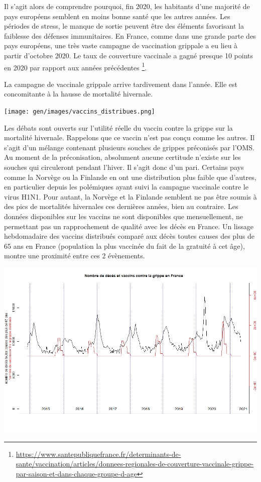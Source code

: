 \documentclass[
]{article}
\begin{document}
Il s'agit alors de comprendre pourquoi, fin 2020, les habitants d'une
majorité de pays européens semblent en moins bonne santé que les autres
années. Les périodes de stress, le manque de sortie peuvent être des
éléments favorisant la faiblesse des défenses immunitaires. En France,
comme dans une grande parte des pays européens, une très vaste campagne
de vaccination grippale a eu lieu à partir d'octobre 2020. Le taux de
couverture vaccinale a gagné presque 10 points en 2020 par rapport aux
années précédentes \footnote{\url{https://www.santepubliquefrance.fr/determinants-de-sante/vaccination/articles/donnees-regionales-de-couverture-vaccinale-grippe-par-saison-et-dans-chaque-groupe-d-age}}.

La campagne de vaccinale grippale arrive tardivement dans l'année. Elle
est concomitante à la hausse de mortalité hivernale.

\texttt{[image: gen/images/vaccins\_distribues.png]}

Les débats sont ouverts sur l'utilité réelle du vaccin contre la grippe
sur la mortalité hivernale. Rappelons que ce vaccin n'est pas conçu
comme les autres. Il s'agit d'un mélange contenant plusieurs souches de
grippes préconisés par l'OMS. Au moment de la préconisation, absolument
aucune certitude n'existe sur les souches qui circuleront pendant
l'hiver. Il s'agit donc d'un pari. Certains pays comme la Norvège ou la
Finlande en ont une distribution plus faible que d'autres, en
particulier depuis les polémiques ayant suivi la campagne vaccinale
contre le virus H1N1. Pour autant, la Norvège et la Finlande semblent ne
pas être soumis à des pics de mortalités hivernales ces dernières
années, bien au contraire. Les données disponibles sur les vaccins ne
sont disponibles que mensuellement, ne permettant pas un rapprochement
de qualité avec les décès en France. Un lissage hebdomadaire des vaccins
distribués comparé aux décès toutes causes des plus de 65 ans en France
(population la plus vaccinée du fait de la gratuité à cet âge), montre
une proximité entre ces 2 évènements.

\includegraphics[width=10.41667in,height=\textheight]{data/images/lien_deces_grippe.png}
\end{document}
